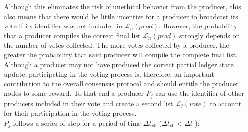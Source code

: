 \documentclass{article}
\begin{document}
Although this eliminates the risk of unethical behavior from the producer, this also means that there would be little incentive for a producer to broadcast its vote if its identifier was not included in $\mathcal{L}_n(prod)$. However, the probability that a producer compiles the correct final list $\mathcal{L}_n(prod)$ strongly depends on the number of votes collected. The more votes collected by a producer, the greater the probability that said producer will compile the complete final list. Although a producer may not have produced the correct partial ledger state update, participating in the voting process is, therefore, an important contribution to the overall consensus protocol and should entitle the producer nodes to some reward. To that end a producer $P_j$ can use the identifier of other producers included in their vote and create a second list $\mathcal{L}_j(vote)$ to account for their participation in the voting process. \\
 
$P_j$ follows a series of step for a period of time $\Delta t_{v0}$ ($\Delta t_{v0} < \Delta t_{v}$):
\end{document}
